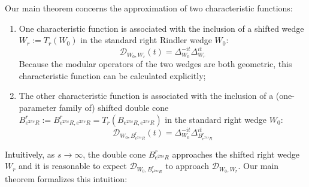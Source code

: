 \documentclass[a4paper,11pt]{article}
\theoremstyle{definition}
\begin{document}
Our main theorem concerns the approximation of two characteristic functions:
\begin{enumerate}
    \item One characteristic function is associated with the inclusion of a shifted wedge $W_r := T_r(W_0)$ in the standard right Rindler wedge $W_0$:
    \begin{equation}
        \mathcal{D}_{W_0, W_r}(t) = \Delta_{W_0}^{-it}\Delta_{W_r}^{it}
    \end{equation}
    Because the modular operators of the two wedges are both geometric, this characteristic function can be calculated explicitly;
    \item The other characteristic function is associated with the inclusion of a (one-parameter family of) shifted double cone $B^r_{e^{2\pi s }R}:=B^r_{e^{2\pi s}R, e^{2\pi s}R} = T_r(B_{e^{2\pi s}R, e^{2\pi s}R})$ in the standard right wedge $W_0$:
    \begin{equation}
        \mathcal{D}_{W_0, B^r_{e^{2\pi s}R}}(t) = \Delta_{W_0}^{-it}\Delta_{B^r_{e^{2\pi s}R}}^{it}
    \end{equation}
\end{enumerate}
Intuitively, as $s\rightarrow\infty$, the double cone $B^r_{e^{2\pi s}R}$ approaches the shifted right wedge $W_r$ and it is reasonable to expect $\mathcal{D}_{W_0,B^r_{e^{2\pi s}R}}$ to approach $\mathcal{D}_{W_0, W_r}$. Our main theorem formalizes this intuition:
\end{document}
